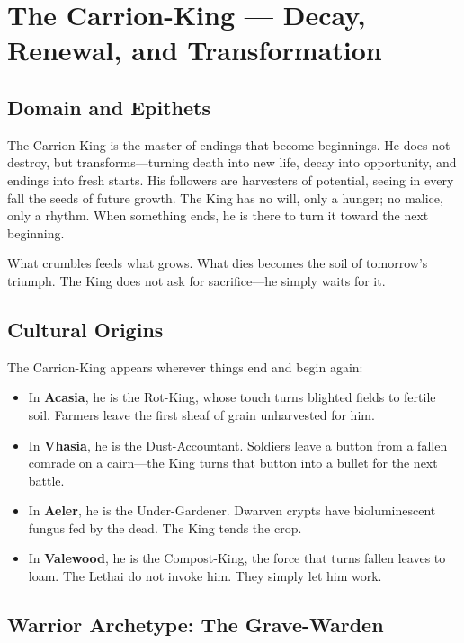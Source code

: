 \section{The Carrion-King — Decay, Renewal, and Transformation}

\subsection{Domain and Epithets}

The Carrion-King is the master of endings that become beginnings. He does not destroy, but transforms—turning death into new life, decay into opportunity, and endings into fresh starts. His followers are harvesters of potential, seeing in every fall the seeds of future growth. The King has no will, only a hunger; no malice, only a rhythm. When something ends, he is there to turn it toward the next beginning.

What crumbles feeds what grows. What dies becomes the soil of tomorrow's triumph. The King does not ask for sacrifice—he simply waits for it.

\subsection{Cultural Origins}

The Carrion-King appears wherever things end and begin again:

\begin{itemize}
\item In \textbf{Acasia}, he is the Rot-King, whose touch turns blighted fields to fertile soil. Farmers leave the first sheaf of grain unharvested for him.
\item In \textbf{Vhasia}, he is the Dust-Accountant. Soldiers leave a button from a fallen comrade on a cairn—the King turns that button into a bullet for the next battle.
\item In \textbf{Aeler}, he is the Under-Gardener. Dwarven crypts have bioluminescent fungus fed by the dead. The King tends the crop.
\item In \textbf{Valewood}, he is the Compost-King, the force that turns fallen leaves to loam. The Lethai do not invoke him. They simply let him work.
\end{itemize}

\subsection{Warrior Archetype: The Grave-Warden}

